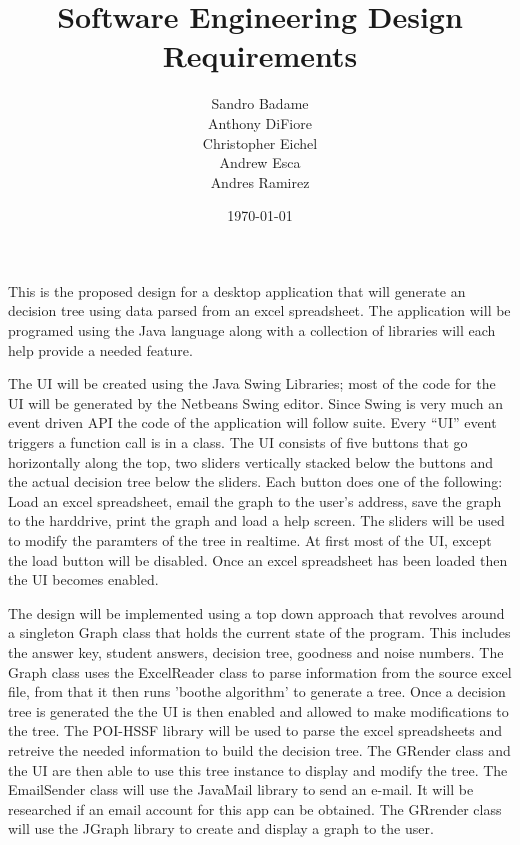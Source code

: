 \documentclass{article}
\begin{document}
\title{Software Engineering Design Requirements}
\author{
Sandro Badame\\
Anthony DiFiore\\
Christopher Eichel\\
Andrew Esca\\
Andres Ramirez
}
\date{\today}
\maketitle
This is the proposed design for a desktop application that will generate an decision tree using data parsed from an excel spreadsheet.
The application will be programed using the Java language along with a collection of libraries will each help provide a needed feature.

The UI will be created using the Java Swing Libraries; most of the code for the UI will be generated by the Netbeans Swing editor. Since Swing is very much an event driven API the code of the application will follow suite. Every ``UI'' event triggers a function call is in a class. The UI consists of five buttons that go horizontally along the top, two sliders vertically stacked below the buttons and the actual decision tree below the sliders. Each button does one of the following: Load an excel spreadsheet, email the graph to the user's address, save the graph to the harddrive, print the graph and load a help screen. The sliders will be used to modify the paramters of the tree in realtime. At first most of the UI, except the load button will be disabled. Once an excel spreadsheet has been loaded then the UI becomes enabled. 

The design will be implemented using a top down approach that revolves around a singleton Graph class that holds the current state of the program. 
This includes the answer key, student answers, decision tree, goodness and noise numbers. 
The Graph class uses the ExcelReader class to parse information from the source excel file, from that it then runs 'boothe algorithm' to generate a tree. 
Once a decision tree is generated the the UI is then enabled and allowed to make modifications to the tree.
The POI-HSSF library will be used to parse the excel spreadsheets and retreive the needed information to build the decision tree.
The GRender class and the UI are then able to use this tree instance to display and modify the tree.
The EmailSender class will use the JavaMail library to send an e-mail. It will be researched if an email account for this app can be obtained.
The GRrender class will use the JGraph library to create and display a graph to the user. 
\end{document}
